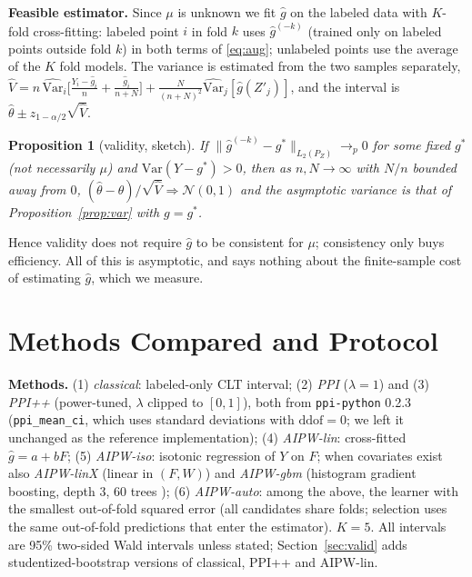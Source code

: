 \documentclass{article}
\newtheorem{proposition}{Proposition}
\newcommand{\Var}{\mathrm{Var}}
\begin{document}
\textbf{Feasible estimator.} Since $\mu$ is unknown we fit $\hat g$ on the labeled data with $K$-fold cross-fitting: labeled point $i$ in fold $k$ uses $\hat g^{(-k)}$ (trained only on labeled points outside fold $k$) in both terms of \eqref{eq:aug}; unlabeled points use the average of the $K$ fold models. The variance is estimated from the two samples separately,
$\hat V=n\,\widehat{\Var}_i\big[\tfrac{Y_i-\hat g_i}{n}+\tfrac{\hat g_i}{n+N}\big]+\tfrac{N}{(n+N)^2}\widehat{\Var}_j[\hat g(Z'_j)]$, and the interval is $\hat\theta\pm z_{1-\alpha/2}\sqrt{\hat V}$.
\begin{proposition}[validity, sketch]\label{prop:valid}
If $\|\hat g^{(-k)}-g^\ast\|_{L_2(P_Z)}\to_p0$ for some fixed $g^\ast$ (not necessarily $\mu$) and $\Var(Y-g^\ast)>0$, then as $n,N\to\infty$ with $N/n$ bounded away from $0$, $(\hat\theta-\theta)/\sqrt{\hat V}\Rightarrow\mathcal N(0,1)$ and the asymptotic variance is that of Proposition~\ref{prop:var} with $g=g^\ast$.
\end{proposition}
Hence validity does not require $\hat g$ to be consistent for $\mu$; consistency only buys efficiency. All of this is asymptotic, and says nothing about the finite-sample cost of estimating $\hat g$, which we measure.

\section{Methods Compared and Protocol}\label{sec:setup}
\textbf{Methods.} (1) \emph{classical}: labeled-only CLT interval; (2) \emph{PPI} ($\lambda=1$) and (3) \emph{PPI++} (power-tuned, $\lambda$ clipped to $[0,1]$), both from \texttt{ppi-python} 0.2.3 (\texttt{ppi\_mean\_ci}, which uses standard deviations with $\mathrm{ddof}=0$; we left it unchanged as the reference implementation); (4) \emph{AIPW-lin}: cross-fitted $\hat g=a+bF$; (5) \emph{AIPW-iso}: isotonic regression of $Y$ on $F$; when covariates exist also \emph{AIPW-linX} (linear in $(F,W)$) and \emph{AIPW-gbm} (histogram gradient boosting, depth 3, 60 trees \citep{pedregosa2011sklearn}); (6) \emph{AIPW-auto}: among the above, the learner with the smallest out-of-fold squared error (all candidates share folds; selection uses the same out-of-fold predictions that enter the estimator). $K=5$. All intervals are 95\% two-sided Wald intervals unless stated; Section~\ref{sec:valid} adds studentized-bootstrap versions of classical, PPI++ and AIPW-lin.
\end{document}
